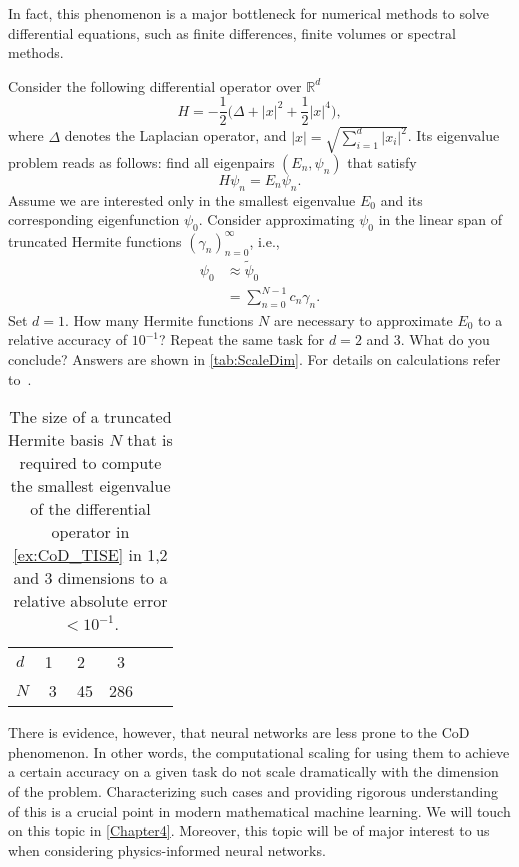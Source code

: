 In fact, this phenomenon is a major bottleneck for numerical methods to solve
differential equations, such as finite differences, finite volumes or spectral
methods. 
\begin{boxedexample} {\theexample}
    \label{ex:CoD_TISE}
Consider the following differential operator over $\mathbb{R}^d$
\begin{equation*}
    H = -\frac{1}{2} \bigl(\Delta + |x|^2 + \frac{1}{2} |x|^4 \bigr), 
\end{equation*}
where $\Delta$ denotes the Laplacian operator, and $|x| = \sqrt{\sum_{i=1}^d |x_i|^2}$. Its eigenvalue problem reads as follows: find all eigenpairs $(E_n, \psi_n)$
that satisfy
\begin{equation*}
    H \psi_n = E_n \psi_n. 
\end{equation*}
Assume we are interested only in the smallest eigenvalue $E_0$ and its
corresponding eigenfunction $\psi_0$. Consider approximating $\psi_0$
in the linear span of truncated Hermite functions $(\gamma_n)_{n=0}^\infty$,
i.e., 
\begin{align*}
    \psi_0 &\approx \tilde{\psi}_0 \\
    &= \sum_{n=0}^{N-1} c_n \gamma_n.
\end{align*}
Set $d=1$. How many Hermite functions $N$ are necessary to approximate $E_0$ to
a relative accuracy of $10^{-1}$? Repeat the same task for $d=2$ and 3. What do you
conclude? Answers are shown in \autoref{tab:ScaleDim}. For details on
calculations refer to~\cite{Saleh:thesis:2023}.
\end{boxedexample}
\begin{table}[t]
	\centering
	\caption[Size of basis to ensure convergence for an increasing problem dimensionality]{The size of a truncated Hermite basis $N$ that is required 
	to compute the smallest eigenvalue of the differential operator in
	\autoref{ex:CoD_TISE} in
	1,2 and 3 dimensions to a relative absolute error $< 10^{-1}$.}
	\begin{tabular}{lccccc}
		\hline\hline
		$d$ &1~&2~ &3		\\
		$N$   & 3 & 45 & 286  \\
		\hline\hline
	\end{tabular}
	\label{tab:ScaleDim}
\end{table}
There is evidence, however, that neural networks are less prone to the CoD
phenomenon. In other words, the computational scaling for using them to achieve
a certain accuracy on a given task do not scale dramatically with the dimension
of the problem. Characterizing such cases and providing rigorous understanding of
this is a crucial point in modern mathematical machine learning. We will touch
on this topic in \autoref{Chapter4}. Moreover, this topic will be of major
interest to us when considering physics-informed neural networks. 

